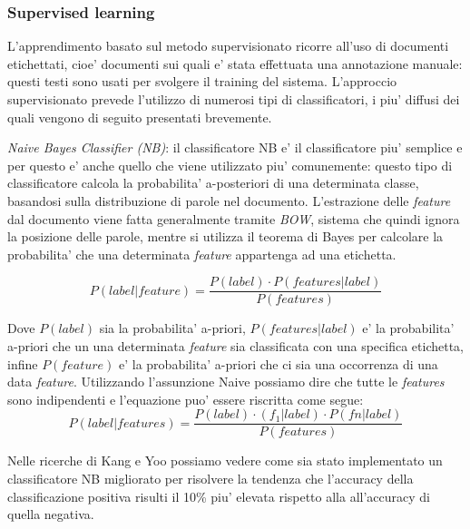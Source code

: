 \documentclass[a4paper,12pt,openright,twoside]{report}
\theoremstyle{definition}
\begin{document}
\subsubsection{Supervised learning}
L’apprendimento basato sul metodo supervisionato ricorre all'uso di documenti etichettati,
cioe' documenti sui quali e' stata effettuata una annotazione manuale: questi 
testi sono usati
per svolgere il training del sistema. L'approccio supervisionato prevede l'utilizzo
di numerosi tipi di classificatori, i piu' diffusi dei quali vengono di seguito
presentati brevemente.

\emph{Naive Bayes Classifier (NB)}: il classificatore NB e' il classificatore piu' semplice
e per questo e' anche quello che viene utilizzato piu' comunemente: questo tipo di classificatore calcola
la probabilita' a-posteriori di una determinata classe, basandosi sulla distribuzione
di parole nel documento. L'estrazione delle \emph{feature} dal documento viene fatta
generalmente 
tramite \emph{BOW}, sistema che quindi ignora la posizione delle parole, mentre si utilizza il
teorema di Bayes per calcolare la probabilita' che una determinata \emph{feature}
appartenga ad una etichetta.

\begin{equation}
	P(label|feature)=\frac{P(label)\cdot{}P(features|label)}{P(features)}
	\label{Bayes}
\end{equation}

Dove $P(label)$ sia la probabilita' a-priori, $P(features|label)$ e'
la probabilita' a-priori che un una determinata \emph{feature} sia
classificata con una specifica etichetta, infine $P(feature)$
e' la probabilita' a-priori che ci sia una occorrenza di una data
\emph{feature}. Utilizzando l'assunzione Naive possiamo dire che tutte le \emph{features} sono indipendenti
e l'equazione puo' essere riscritta come segue:
\begin{equation}
	P(label|features)=\frac{P(label)\cdot{}(f_1|label)\cdot{}P(fn|label)}{P(features)}
	\label{Naive Bayes}
\end{equation}

Nelle ricerche di Kang e Yoo %
possiamo vedere come sia stato implementato un classificatore NB migliorato per risolvere
la tendenza che l'accuracy della classificazione positiva risulti il 10\% piu' elevata rispetto alla
all'accuracy di quella negativa.
\end{document}
